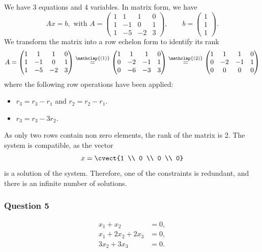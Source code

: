 We have 3 equations and 4 variables. In matrix form, we have
\[
Ax = b, \text{ with } A= \begin{pmatrix}
1&1&1&0\\ 1&-1&0&1\\ 1&-5&-2&3
\end{pmatrix}, \qquad b = \begin{pmatrix}
1\\1\\1
\end{pmatrix}.
\]
We transform the matrix into a row echelon form to identify its rank
\[
A=
\begin{pmatrix}
  1 & 1 & 1 & 0 \\ 1  & -1 & 0 & 1 \\ 1  & -5 & -2 & 3  
\end{pmatrix}
\stackrel{\mathclap{(1)}}{=}
\begin{pmatrix}
  1 & 1 & 1 & 0 \\ 0 & -2 & -1 & 1 \\ 0 & -6 & -3 & 3
\end{pmatrix}
\stackrel{\mathclap{(2)}}{=}
\begin{pmatrix}
  1 & 1 & 1 & 0 \\ 0 & -2 & -1 & 1 \\ 0 & 0 & 0 & 0 
\end{pmatrix}
\]
where the following row operations have been applied:
\begin{itemize}
\item[(1)] $r_3 = r_3 - r_1$ and $r_2=r_2-r_1$.
\item[(2)] $r_3 = r_3 -3 r_2$.
\end{itemize}
As only two rows contain non zero elements, the rank of the matrix is 2. 
The system is compatible, as the vector
\[
x=\cvect{1 \\ 0 \\ 0 \\ 0}
\]
is a solution of the system. Therefore, one of the constraints is
redundant, and there is an infinite number of solutions.

\subsubsection*{Question 5}

\begin{align*}
x_1+x_2&=0,\\
x_1+2x_2+2x_3&=0,\\
3x_2+3x_3&=0.
\end{align*}

